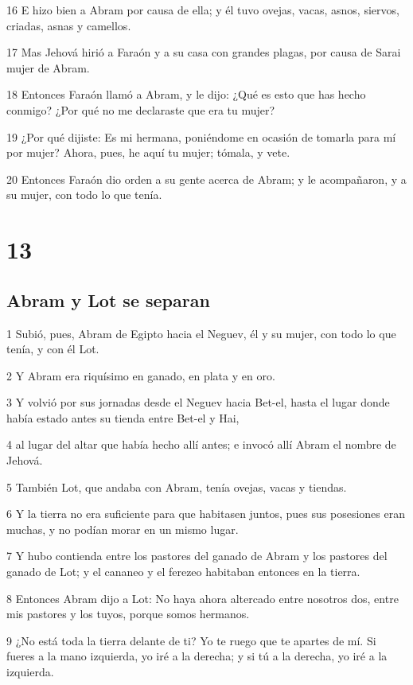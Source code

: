 16 E hizo bien a Abram por causa de ella; y él tuvo ovejas, vacas, asnos, siervos, criadas, asnas y camellos.

17 Mas Jehová hirió a Faraón y a su casa con grandes plagas, por causa de Sarai mujer de Abram.

18 Entonces Faraón llamó a Abram, y le dijo: ¿Qué es esto que has hecho conmigo? ¿Por qué no me declaraste que era tu mujer?

19 ¿Por qué dijiste: Es mi hermana, poniéndome en ocasión de tomarla para mí por mujer? Ahora, pues, he aquí tu mujer; tómala, y vete.

20 Entonces Faraón dio orden a su gente acerca de Abram; y le acompañaron, y a su mujer, con todo lo que tenía.

\chapter{13}

\section{Abram y Lot se separan}

1 Subió, pues, Abram de Egipto hacia el Neguev, él y su mujer, con todo lo que tenía, y con él Lot.

2 Y Abram era riquísimo en ganado, en plata y en oro.

3 Y volvió por sus jornadas desde el Neguev hacia Bet-el, hasta el lugar donde había estado antes su tienda entre Bet-el y Hai,

4 al lugar del altar que había hecho allí antes; e invocó allí Abram el nombre de Jehová.

5 También Lot, que andaba con Abram, tenía ovejas, vacas y tiendas.

6 Y la tierra no era suficiente para que habitasen juntos, pues sus posesiones eran muchas, y no podían morar en un mismo lugar.

7 Y hubo contienda entre los pastores del ganado de Abram y los pastores del ganado de Lot; y el cananeo y el ferezeo habitaban entonces en la tierra.

8 Entonces Abram dijo a Lot: No haya ahora altercado entre nosotros dos, entre mis pastores y los tuyos, porque somos hermanos.

9 ¿No está toda la tierra delante de ti? Yo te ruego que te apartes de mí. Si fueres a la mano izquierda, yo iré a la derecha; y si tú a la derecha, yo iré a la izquierda.

